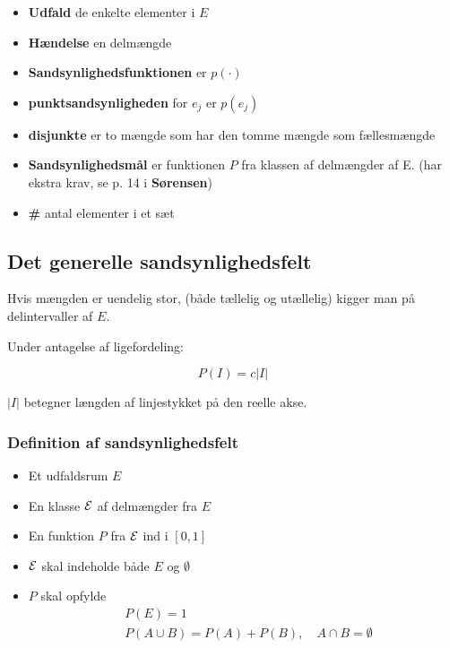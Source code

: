 \begin{itemize}
    \item \textbf{Udfald} de enkelte elementer i $E$
    \item \textbf{Hændelse} en delmængde
    \item \textbf{Sandsynlighedsfunktionen} er $p(\cdot)$
    \item \textbf{punktsandsynligheden} for $e_j$ er $p(e_j)$
    \item \textbf{disjunkte} er to mængde som har den tomme mængde som fællesmængde
    \item \textbf{Sandsynlighedsmål} er funktionen $P$ fra klassen af delmængder af E. (har ekstra krav, se p. 14 i \textbf{Sørensen})
    \item \textbf{\#} antal elementer i et sæt
\end{itemize}

\subsection{Det generelle sandsynlighedsfelt}

Hvis mængden er uendelig stor, (både tællelig og utællelig) kigger man på delintervaller af $E$.

Under antagelse af ligefordeling:

\begin{equation}
    P(I) = c\lvert I \rvert
\end{equation}

$\lvert I \rvert$ betegner længden af linjestykket på den reelle akse.

\subsubsection{Definition af sandsynlighedsfelt}

\begin{itemize}
    \item Et udfaldsrum $E$ 
    \item En klasse $\mathcal{E}$ af delmængder fra $E$
    \item En funktion $P$ fra $\mathcal{E}$ ind i $[0,1]$
    \item $\mathcal{E}$ skal indeholde både $E$ og $\emptyset$
    \item $P$ skal opfylde
    \begin{align}
        &P(E) = 1 \\
        &P(A \cup B) = P(A) + P(B), \quad A \cap B = \emptyset
    \end{align}
\end{itemize}

